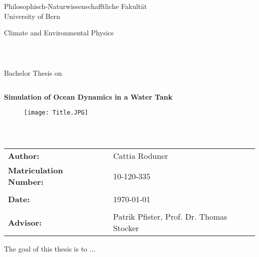 \documentclass[12pt, a4paper, twoside]{article}
\begin{document}
\begin{center}
\Large{Philosophisch-Naturwissenschafftliche Fakultät}\\
\Large{University of Bern}\\
\end{center}


\begin{center}
\Large{Climate and Environmental Physics}
\end{center}
\begin{verbatim}



\end{verbatim}
\begin{center}
\large{Bachelor Thesis on}
\end{center}
\begin{verbatim}

\end{verbatim}
\begin{center}
\textbf{\Large{Simulation of Ocean Dynamics in a Water Tank}}\\
\end{center}

\begin{figure}[h]
 \centering
 \texttt{[image: Title.JPG]}
\end{figure}

\begin{verbatim}



\end{verbatim}

\begin{center}
\begin{tabular}{llll}

\textbf{Author:} & & Cattia Roduner& \\
\textbf{Matriculation Number:} & & 10-120-335& \\
& & \\
\textbf{Date:} & & \today &\\
& & \\
\textbf{Advisor:} & & Patrik Pfister, Prof. Dr. Thomas Stocker &\\

\end{tabular}

\end{center}
\newpage
\thispagestyle{empty}
\mbox{}
\newpage
\abstract
The goal of this thesis is to ...

\newpage
\tableofcontents
\newpage
\end{document}
